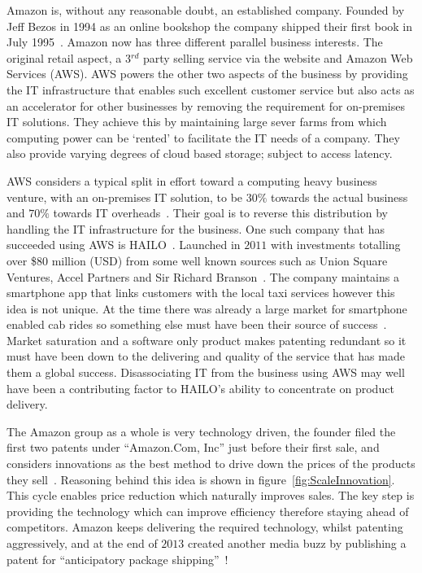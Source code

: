 
{}






Amazon is, without any reasonable doubt, an established company. 
Founded by Jeff Bezos in 1994 as an online bookshop the company shipped their first book in July 1995~\cite{seattle}. 
Amazon now has three different parallel business interests. 
The original retail aspect, a 3$^{rd}$ party selling service via the website and Amazon Web Services (AWS).
AWS powers the other two aspects of the business by providing the IT infrastructure that enables such excellent customer service but also acts as an accelerator for other businesses by removing the requirement for on-premises IT solutions. 
They achieve this by maintaining large sever farms from which computing power can be `rented' to facilitate the IT needs of a company. 
They also provide varying degrees of cloud based storage; subject to access latency.

AWS considers a typical split in effort toward a computing heavy business venture, with an on-premises IT solution, to be $30\%$ towards the actual business and $70\%$ towards IT overheads~\cite{gavin2014ams}. 
Their goal is to reverse this distribution by handling the IT infrastructure for the business. 
One such company that has succeeded using AWS is HAILO~\cite{gavin2014ams}. 
Launched in $2011$ with investments totalling over \$$80$ million (USD) from some well known sources such as Union Square Ventures, Accel Partners and Sir Richard Branson~\cite{hailo}.
The company maintains a smartphone app that links customers with the local taxi services however this idea is not unique. 
At the time there was already a large market for smartphone enabled cab rides so something else must have been their source of success~\cite{ventureBeat}. 
Market saturation and a software only product makes patenting redundant so it must have been down to the delivering and quality of the service that has made them a global success. 
Disassociating IT from the business using AWS may well have been a contributing factor to HAILO's ability to concentrate on product delivery.


The Amazon group as a whole is very technology driven, the founder filed the first two patents under ``Amazon.Com, Inc'' just before their first sale, and considers innovations as the best method to drive down the prices of the products they sell~\cite{bezos1998secure1,bezos1998secure2}. 
Reasoning behind this idea is shown in figure~\ref{fig:ScaleInnovation}.
This cycle enables price reduction which naturally improves sales. 
The key step is providing the technology which can improve efficiency therefore staying ahead of competitors. 
Amazon keeps delivering the required technology, whilst patenting aggressively, and at the end of $2013$ created another media buzz by publishing a patent for ``anticipatory package shipping''~\cite{spiegel2013method}!



